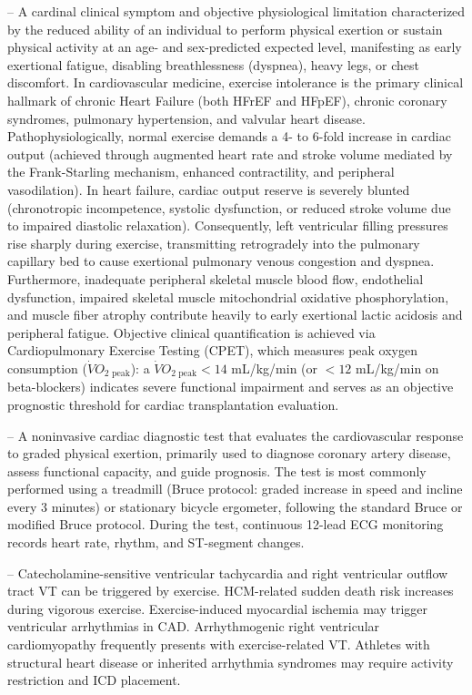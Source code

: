 -- A cardinal clinical symptom and objective physiological limitation characterized by the reduced ability of an individual to perform physical exertion or sustain physical activity at an age- and sex-predicted expected level, manifesting as early exertional fatigue, disabling breathlessness (dyspnea), heavy legs, or chest discomfort. In cardiovascular medicine, exercise intolerance is the primary clinical hallmark of chronic Heart Failure (both HFrEF and HFpEF), chronic coronary syndromes, pulmonary hypertension, and valvular heart disease. Pathophysiologically, normal exercise demands a 4- to 6-fold increase in cardiac output (achieved through augmented heart rate and stroke volume mediated by the Frank-Starling mechanism, enhanced contractility, and peripheral vasodilation). In heart failure, cardiac output reserve is severely blunted (chronotropic incompetence, systolic dysfunction, or reduced stroke volume due to impaired diastolic relaxation). Consequently, left ventricular filling pressures rise sharply during exercise, transmitting retrogradely into the pulmonary capillary bed to cause exertional pulmonary venous congestion and dyspnea. Furthermore, inadequate peripheral skeletal muscle blood flow, endothelial dysfunction, impaired skeletal muscle mitochondrial oxidative phosphorylation, and muscle fiber atrophy contribute heavily to early exertional lactic acidosis and peripheral fatigue. Objective clinical quantification is achieved via Cardiopulmonary Exercise Testing (CPET), which measures peak oxygen consumption ($\dot{V}O_{2\text{ peak}}$): a $\dot{V}O_{2\text{ peak}} < 14$ mL/kg/min (or $<12$ mL/kg/min on beta-blockers) indicates severe functional impairment and serves as an objective prognostic threshold for cardiac transplantation evaluation.

-- A noninvasive cardiac diagnostic test that evaluates the cardiovascular response to graded physical exertion, primarily used to diagnose coronary artery disease, assess functional capacity, and guide prognosis. The test is most commonly performed using a treadmill (Bruce protocol: graded increase in speed and incline every 3 minutes) or stationary bicycle ergometer, following the standard Bruce or modified Bruce protocol. During the test, continuous 12-lead ECG monitoring records heart rate, rhythm, and ST-segment changes.

-- Catecholamine-sensitive ventricular tachycardia and right ventricular outflow tract VT can be triggered by exercise. HCM-related sudden death risk increases during vigorous exercise. Exercise-induced myocardial ischemia may trigger ventricular arrhythmias in CAD. Arrhythmogenic right ventricular cardiomyopathy frequently presents with exercise-related VT. Athletes with structural heart disease or inherited arrhythmia syndromes may require activity restriction and ICD placement.

